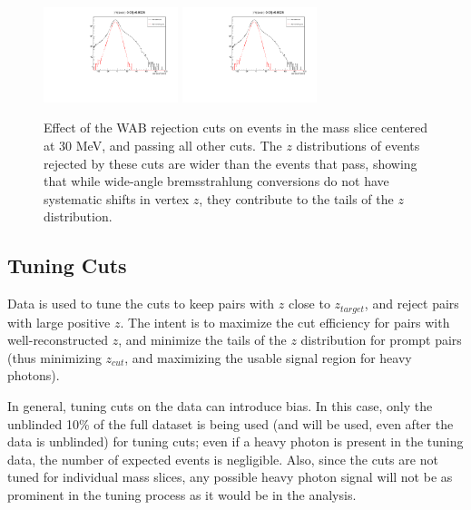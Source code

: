 \begin{figure}[ht]
\begin{center}
    \includegraphics[width=0.35\textwidth,page=6,angle=-90]{vertexing/figs/vertcutplots}
    \includegraphics[width=0.35\textwidth,page=7,angle=-90]{vertexing/figs/vertcutplots}
\end{center}
    \caption{Effect of the WAB rejection cuts on events in the mass slice centered at 30 MeV, and passing all other cuts.
    The $z$ distributions of events rejected by these cuts are wider than the events that pass, showing that while wide-angle bremsstrahlung conversions do not have systematic shifts in vertex $z$, they contribute to the tails of the $z$ distribution.
    }
    \label{fig:wabcut_performance}
\end{figure}

\subsection{Tuning Cuts}
Data is used to tune the cuts to keep pairs with $z$ close to $z_{target}$, and reject pairs with large positive $z$.
The intent is to maximize the cut efficiency for pairs with well-reconstructed $z$, and minimize the tails of the $z$ distribution for prompt pairs (thus minimizing $z_{cut}$, and maximizing the usable signal region for heavy photons).

In general, tuning cuts on the data can introduce bias.
In this case, only the unblinded 10\% of the full dataset is being used (and will be used, even after the data is unblinded) for tuning cuts; even if a heavy photon is present in the tuning data, the number of expected events is negligible.
Also, since the cuts are not tuned for individual mass slices, any possible heavy photon signal will not be as prominent in the tuning process as it would be in the analysis.

